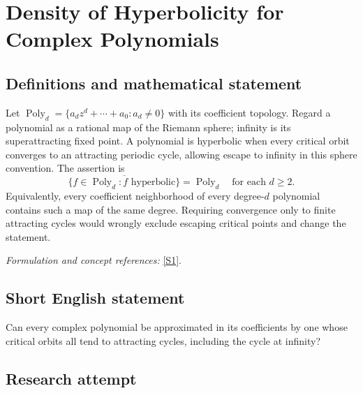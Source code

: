 \documentclass[11pt,a4paper]{article}
\newcommand{\sref}[2]{\hyperlink{source:#1:#2}{[S#2]}}
\newif\ifshowcatalogue
\newcommand{\cataloguescope}[1]{\ifshowcatalogue
 \paragraph{Exact scope in the supplied catalogue.}
 \begin{quote}\small #1\end{quote}\fi}
\begin{document}
\setcounter{section}{214}
\clearpage
\section{\texorpdfstring{Density of Hyperbolicity for Complex Polynomials}{Density of Hyperbolicity for Complex Polynomials}}\label{215}
\subsection{Definitions and mathematical statement}
Let $\operatorname{Poly}_d=\{a_dz^d+\cdots+a_0:a_d\ne0\}$ with its coefficient topology. Regard a polynomial as a rational map of the Riemann sphere; infinity is its superattracting fixed point. A polynomial is hyperbolic when every critical orbit converges to an attracting periodic cycle, allowing escape to infinity in this sphere convention. The assertion is
\[
 \overline{\{f\in\operatorname{Poly}_d:f\text{ hyperbolic}\}}=\operatorname{Poly}_d
 \quad\text{for each }d\ge2.
\]
Equivalently, every coefficient neighborhood of every degree-$d$ polynomial contains such a map of the same degree. Requiring convergence only to finite attracting cycles would wrongly exclude escaping critical points and change the statement.
\par\smallskip\textit{Formulation and concept references:} \sref{215}{1}.
\cataloguescope{For each complex polynomial T of degree at least two, determine whether T can be approximated by polynomials of the same degree all of whose critical points converge under iteration to attracting periodic cycles, that is, whether hyperbolic polynomials are dense in the space of complex polynomials of each degree.}
\subsection{Short English statement}
Can every complex polynomial be approximated in its coefficients by one whose critical orbits all tend to attracting cycles, including the cycle at infinity?
\subsection{Research attempt}
\end{document}
